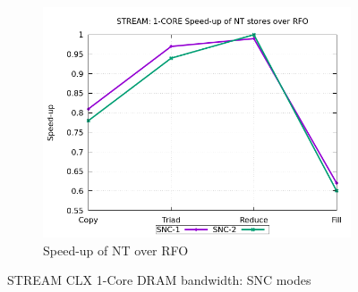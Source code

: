 \documentclass{article}
\begin{document}
\begin{figure}[!hb]
\begin{subfigure}[!hb]{0.3\textwidth}
         \centering
         \includegraphics[width=\textwidth]{../data/clx-8280l-snc/mem_bw_core/mb_core_nt_rfo}
         \caption{Speed-up of NT over RFO}
         \label{figure:mem_bw_core_nt_rfo_clx_snc}
    \end{subfigure}

    \caption{STREAM CLX 1-Core DRAM bandwidth: SNC modes}
    \label{figure:mem_bw_core_clx_snc}
\end{figure}
\end{document}
